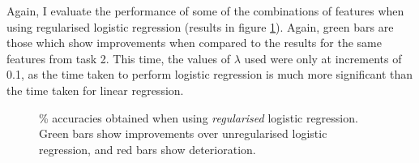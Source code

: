 \documentclass[a4paper,11pt]{article}
\begin{document}
Again, I evaluate the performance of some of the combinations of features when using regularised logistic regression (results in figure \ref{task3reglogistic}).  Again, green bars are those which show improvements when compared to the results for the same features from task 2.  This time, the values of $\lambda$ used were only at increments of 0.1, as the time taken to perform logistic regression is much more significant than the time taken for linear regression.

\begin{figure}
\centering
\begin{bchart}[step=20,max=100]
		\smallskip
		\smallskip
		\smallskip
		\smallskip
		\smallskip
		\smallskip
		\smallskip
		\smallskip
		\smallskip
		\smallskip
		\smallskip
		\smallskip
		\smallskip
		\smallskip
		\smallskip
		\smallskip
\end{bchart}
\caption{\% accuracies obtained when using \textit{regularised} logistic regression.  Green bars show improvements over unregularised logistic regression, and red bars show deterioration.}
\label{task3reglogistic}
\end{figure}
\end{document}
